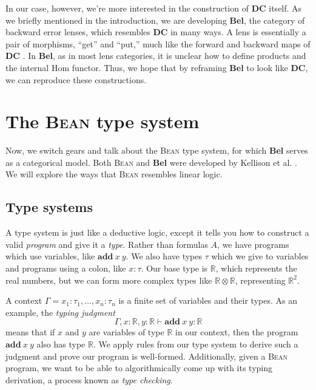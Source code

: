 \documentclass[a4paper]{article}
\newcommand{\DC}{\textbf{DC}}
\newcommand{\Bel}{\textbf{Bel}}
\newcommand{\Bean}{\textsc{Bean}}
\newcommand{\R}{\mathbb{R}}
\newcommand{\add}[2]{\textbf{add}\ {#1}\ {#2}}
\begin{document}
In our case, however, we're more interested in the construction of \DC{} itself. As we briefly mentioned in the introduction, we are developing \Bel{}, the category of backward error lenses, which resembles \DC{} in many ways. A lens is essentially a pair of morphisms, ``get'' and ``put,'' much like the forward and backward maps of \DC{} \cite{nlab:lens}. In \Bel{}, as in most lens categories, it is unclear how to define products and the internal Hom functor. Thus, we hope that by reframing \Bel{} to look like \DC{}, we can reproduce these constructions. 

\section{The \Bean{} type system}
Now, we switch gears and talk about the \Bean{} type system, for which \Bel{} serves as a categorical model. Both \Bean{} and \Bel{} were developed by Kellison et al. \cite{kellison2025bean}. We will explore the ways that \Bean{} resembles linear logic. 

\subsection{Type systems}
A type system is just like a deductive logic, except it tells you how to construct a valid \emph{program} and give it a \emph{type}. Rather than formulas $A$, we have programs which use variables, like $\add{x}{y}$. We also have types $\tau$ which we give to variables and programs using a colon, like $x:\tau$. Our base type is $\R$, which represents the real numbers, but we can form more complex types like $\R\otimes \R$, representing $\R^2$.

A context $\Gamma=x_1:\tau_1,\dots,x_n:\tau_n$ is a finite set of variables and their types. As an example, the \emph{typing judgment}
\begin{equation*}
    \Gamma,x:\R,y:\R\vdash \add{x}{y}:\R
\end{equation*}
means that if $x$ and $y$ are variables of type $\R$ in our context, then the program $\add{x}{y}$ also has type $\R$. We apply rules from our type system to derive such a judgment and prove our program is well-formed. Additionally, given a \Bean{} program, we want to be able to algorithmically come up with its typing derivation, a process known as \emph{type checking}.
\end{document}
